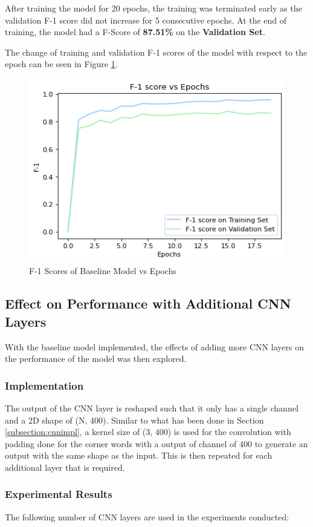 \documentclass[sigconf,nonacm=true]{acmart}
\begin{document}
After training the model for 20 epochs, the training was terminated early as the validation F-1 score did not increase for 5 consecutive epochs. At the end of training, the model had a F-Score of \textbf{87.51\%} on the \textbf{Validation Set}.

The change of training and validation F-1 scores of the model with respect to the epoch can be seen in Figure \ref{fig:singlelayerf1}.


\begin{figure}[H]
	\centering
	\includegraphics[scale=0.55]{figures/1layerf1.png}
	\caption{F-1 Scores of Baseline Model vs Epochs}
	\label{fig:singlelayerf1}
\end{figure}

\subsection{Effect on Performance with Additional CNN Layers}
With the baseline model implemented, the effects of adding more CNN layers on the performance of the model was then explored. 

\subsubsection{Implementation}
The output of the CNN layer is reshaped such that it only has a single channel and a 2D shape of (N, 400). Similar to what has been done in Section \ref{subsection:cnnimpl}, a kernel size of (3, 400) is used for the convolution with padding done for the corner words with a output of channel of 400 to generate an output with the same shape as the input. This is then repeated for each additional layer that is required.

\subsubsection{Experimental Results}
The following number of CNN layers are used in the experiments conducted:
\end{document}
